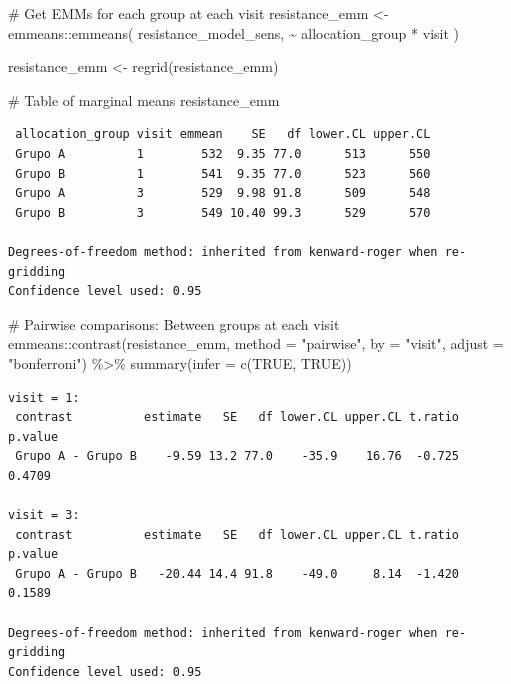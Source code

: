 \documentclass[
  letterpaper,
  DIV=11,
  numbers=noendperiod]{scrartcl}
\newenvironment{Shaded}{\begin{snugshade}}{\end{snugshade}}
\newcommand{\AttributeTok}[1]{\textcolor[rgb]{0.40,0.45,0.13}{#1}}
\newcommand{\CommentTok}[1]{\textcolor[rgb]{0.37,0.37,0.37}{#1}}
\newcommand{\ConstantTok}[1]{\textcolor[rgb]{0.56,0.35,0.01}{#1}}
\newcommand{\FunctionTok}[1]{\textcolor[rgb]{0.28,0.35,0.67}{#1}}
\newcommand{\NormalTok}[1]{\textcolor[rgb]{0.00,0.23,0.31}{#1}}
\newcommand{\OtherTok}[1]{\textcolor[rgb]{0.00,0.23,0.31}{#1}}
\newcommand{\SpecialCharTok}[1]{\textcolor[rgb]{0.37,0.37,0.37}{#1}}
\newcommand{\StringTok}[1]{\textcolor[rgb]{0.13,0.47,0.30}{#1}}
\begin{document}
\begin{Shaded}
\begin{Highlighting}[]
\CommentTok{\# Get EMMs for each group at each visit}
\NormalTok{resistance\_emm }\OtherTok{\textless{}{-}}\NormalTok{ emmeans}\SpecialCharTok{::}\FunctionTok{emmeans}\NormalTok{(}
\NormalTok{    resistance\_model\_sens, }
    \SpecialCharTok{\textasciitilde{}}\NormalTok{ allocation\_group }\SpecialCharTok{*}\NormalTok{ visit}
\NormalTok{)}

\NormalTok{resistance\_emm }\OtherTok{\textless{}{-}} \FunctionTok{regrid}\NormalTok{(resistance\_emm)}

\CommentTok{\# Table of marginal means}
\NormalTok{resistance\_emm}
\end{Highlighting}
\end{Shaded}

\begin{verbatim}
 allocation_group visit emmean    SE   df lower.CL upper.CL
 Grupo A          1        532  9.35 77.0      513      550
 Grupo B          1        541  9.35 77.0      523      560
 Grupo A          3        529  9.98 91.8      509      548
 Grupo B          3        549 10.40 99.3      529      570

Degrees-of-freedom method: inherited from kenward-roger when re-gridding 
Confidence level used: 0.95 
\end{verbatim}

\begin{Shaded}
\begin{Highlighting}[]
\CommentTok{\# Pairwise comparisons: Between groups at each visit}
\NormalTok{emmeans}\SpecialCharTok{::}\FunctionTok{contrast}\NormalTok{(resistance\_emm, }\AttributeTok{method =} \StringTok{"pairwise"}\NormalTok{, }\AttributeTok{by =} \StringTok{"visit"}\NormalTok{, }\AttributeTok{adjust =} \StringTok{"bonferroni"}\NormalTok{) }\SpecialCharTok{\%\textgreater{}\%} \FunctionTok{summary}\NormalTok{(}\AttributeTok{infer =} \FunctionTok{c}\NormalTok{(}\ConstantTok{TRUE}\NormalTok{, }\ConstantTok{TRUE}\NormalTok{))}
\end{Highlighting}
\end{Shaded}

\begin{verbatim}
visit = 1:
 contrast          estimate   SE   df lower.CL upper.CL t.ratio p.value
 Grupo A - Grupo B    -9.59 13.2 77.0    -35.9    16.76  -0.725  0.4709

visit = 3:
 contrast          estimate   SE   df lower.CL upper.CL t.ratio p.value
 Grupo A - Grupo B   -20.44 14.4 91.8    -49.0     8.14  -1.420  0.1589

Degrees-of-freedom method: inherited from kenward-roger when re-gridding 
Confidence level used: 0.95 
\end{verbatim}
\end{document}
